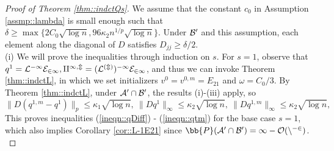 \documentclass[12pt]{article}%
\theoremstyle{plain}%
\theoremstyle{remark}
\begin{document}
\begin{proof}[Proof of Theorem \ref{thm::indctQs}]
We assume that the constant $c_0$ in Assumption \ref{assmp::lambda} is small enough such that $\delta \ge \max\{2C_0\sqrt{\log n}, 96\kappa_2n^{1/p}\sqrt{\log n} \}$. Under $\cal{B}^0$ and this assumption, each element along the diagonal of $D$ satisfies $D_{jj} \ge \delta /2$.\\

(i) We will prove the inequalities through induction on $s$. For $s=1$, observe that $q^1 = \cal{L}^{-1} E_{21}, q^{1,m} = (\cal{L}^{(m)})^{-1} E_{21}$, and thus we can invoke Theorem \ref{thm::indctL}, in which we set initializers $v^0 = v^{0,m} = E_{21}$ and $\omega = C_0/3$. By Theorem \ref{thm::indctL}, under $\cal{A}^0 \cap \cal{B}^0$, the results (i)-(iii) apply, so
\begin{equation}\label{ineqn::indctQuadBase}
\| D (q^{1,m} - q^1) \|_p \le \kappa_1 \sqrt{ \log n}, ~ \| D q^1 \|_\infty \le \kappa_2\sqrt{ \log n}, ~ \| D q^{1,m} \|_\infty \le \kappa_2\sqrt{ \log n},
\end{equation}
This proves inequalities (\ref{ineqn::qDiff}) - (\ref{ineqn::qtm}) for the base case $s=1$, which also implies Corollary \ref{cor::L-1E21} since $\bb{P}(\cal{A}^0 \cap \cal{B}^0) = 1 - O(n^{-2})$. \\


\end{proof}
\end{document}
